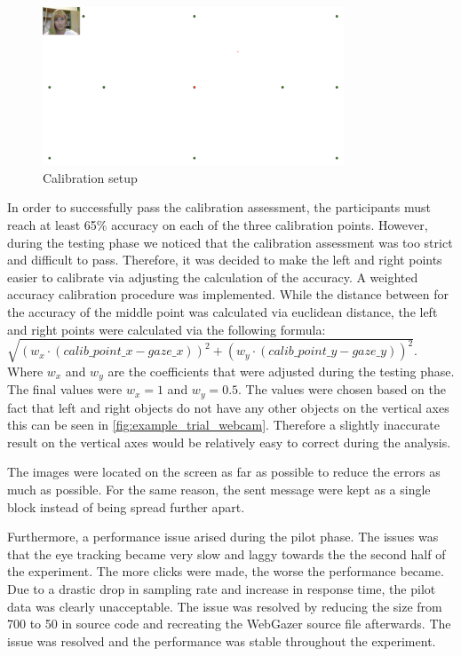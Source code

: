 \begin{figure}
    \centering
    \includegraphics[width=0.8\textwidth]{images/calibration_webcam.png}
    \caption{Calibration setup}
    \label{fig:calibration_webcam}
\end{figure}

In order to successfully pass the calibration assessment, the participants must reach at least 65\% accuracy on each of the three calibration points. However, during the testing phase we noticed that the calibration assessment was too strict and difficult to pass. Therefore, it was decided to make the left and right points easier to calibrate via adjusting the calculation of the accuracy. A weighted accuracy calibration procedure was implemented. While the distance between for the accuracy of the middle point was calculated via euclidean distance, the left and right points were calculated via the following formula: $\sqrt{(w_x\cdot(calib\_point\_x - gaze\_x))^2 + (w_y\cdot(calib\_point\_y - gaze\_y))^2}$. Where $w_x$ and $w_y$ are the coefficients that were adjusted during the testing phase. The final values were $w_x = 1$ and $w_y = 0.5$. The values were chosen based on the fact that left and right objects do not have any other objects on the vertical axes this can be seen in \autoref{fig:example_trial_webcam}. Therefore a slightly inaccurate result on the vertical axes would be relatively easy to correct during the analysis.

The images were located on the screen as far as possible to reduce the errors as much as possible. For the same reason, the sent message were kept as a single block instead of being spread further apart. 

Furthermore, a performance issue arised during the pilot phase. The issues was that the eye tracking became very slow and laggy towards the the second half of the experiment. The more clicks were made, the worse the performance became. Due to a drastic drop in sampling rate and increase in response time, the pilot data was clearly unacceptable. The issue was resolved by reducing the  size from 700 to 50 in source code and recreating the WebGazer source file afterwards. The issue was resolved and the performance was stable throughout the experiment. 

